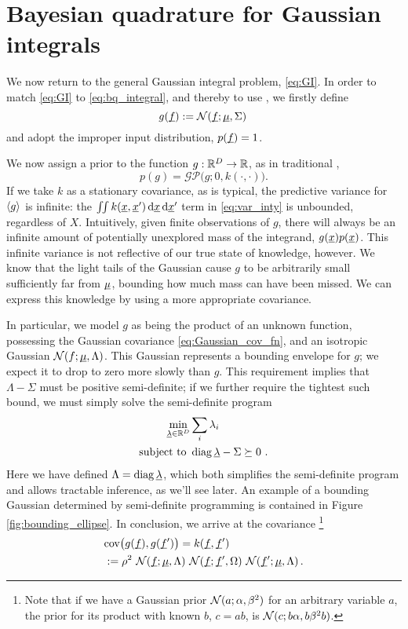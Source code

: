 \documentclass[twoside]{article}
\begin{document}
\section{Bayesian quadrature for Gaussian integrals}

We now return to the general Gaussian integral problem, \eqref{eq:GI}. In order to match \eqref{eq:GI} to \eqref{eq:bq_integral}, and thereby to use \bq, we firstly define 
\begin{equation}
 g(\underline{\smash{f}}) := \mathcal{N}(\underline{\smash{f}};\underline{\smash{\mu}},\Sigma)\,
\end{equation}
and adopt the improper input distribution, $p(\underline{\smash{f}}) = 1$. 

We now assign a \gp prior 
to the function $g: \mathbb{R}^D \to \mathbb{R}$, as in traditional \bq,
\begin{equation}
 p(g) = \mathcal{GP}\bigl(g; 0 , k(\cdot,\cdot)\bigr).
\end{equation}
 If we take $k$ as a stationary covariance, as is typical, the predictive variance for $\langle g \rangle$ is infinite: the $\iint k(\underline{\smash{x}},\underline{\smash{x}}')\,\mathrm{d}\underline{\smash{x}}\,\mathrm{d} \underline{\smash{x}}'$ term in \eqref{eq:var_inty} is unbounded, regardless of $X$. Intuitively, given finite observations of $g$, there will always be an infinite amount of potentially unexplored mass of the integrand, $g(\underline{\smash{x}})p(\underline{\smash{x}})$. This infinite variance is not reflective of our true state of knowledge, however. We know that the light tails of the Gaussian cause $g$ to be arbitrarily small sufficiently far from $\underline{\smash{\mu}}$, bounding how much mass can have been missed. We can express this knowledge by using a more appropriate covariance. 

In particular, we model $g$ as being the product of an unknown function, possessing the Gaussian covariance \eqref{eq:Gaussian_cov_fn}, and an isotropic Gaussian $\mathcal{N}(f;\underline{\smash{\mu}},\Lambda)$. This Gaussian represents a bounding envelope for $g$; we expect it to drop to zero more slowly than $g$. This requirement implies that $\Lambda - \Sigma$ must be positive semi-definite; if we further require the tightest such bound, we must simply solve the semi-definite program
\begin{align}
 \min_{\underline{\smash{\lambda}}\in\mathbb{R}^D} & \sum_i \lambda_i\\
\text{subject to } & \operatorname{diag}{\underline{\smash{\lambda}}} - \Sigma \succeq 0~.
\end{align}
Here we have defined $\Lambda = \operatorname{diag} \underline{\smash{\lambda}}$, which both simplifies the semi-definite program and allows tractable inference, as we'll see later. An example of a bounding Gaussian determined by semi-definite programming is contained in Figure \ref{fig:bounding_ellipse}. In conclusion, we arrive at the covariance%
\footnote{Note that if we have a Gaussian prior $\mathcal{N}(a;\alpha,\beta^2)$ for an arbitrary variable $a$, the prior for its product with known $b$, $c = a b$, is $\mathcal{N}(c;b \alpha,b \beta^2 b)$.}
\begin{align}
 & \text{cov}\bigl(g(\underline{\smash{f}}), g(\underline{\smash{f}}')\bigr) = k(\underline{\smash{f}}, \underline{\smash{f}}')\nonumber\\ & := \rho^2~\mathcal{N}(\underline{\smash{f}};\underline{\smash{\mu}},\Lambda)~\mathcal{N}(\underline{\smash{f}};\underline{\smash{f}}',\Omega)~\mathcal{N}(\underline{\smash{f}}';\underline{\smash{\mu}},\Lambda)\,.
\end{align}
\end{document}
